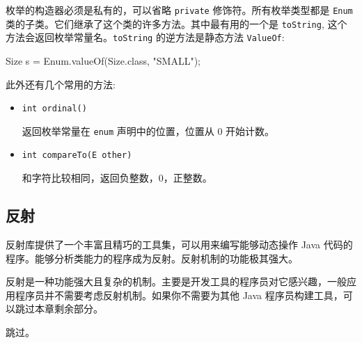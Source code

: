 枚举的构造器必须是私有的，可以省略 \texttt{private} 修饰符。所有枚举类型都是 \texttt{Enum} 类的子类。它们继承了这个类的许多方法。其中最有用的一个是 \texttt{toString}, 这个方法会返回枚举常量名。\texttt{toString} 的逆方法是静态方法 \texttt{ValueOf}:
\begin{Java}
Size s = Enum.valueOf(Size.class, "SMALL");
\end{Java}

此外还有几个常用的方法:
\begin{itemize}
    \item \texttt{int ordinal()}
    
    返回枚举常量在 \texttt{enum} 声明中的位置，位置从 0 开始计数。
    \item \texttt{int compareTo(E other)}
    
    和字符比较相同，返回负整数，0，正整数。
\end{itemize}

\subsection{反射}

反射库提供了一个丰富且精巧的工具集，可以用来编写能够动态操作 Java 代码的程序。能够分析类能力的程序成为反射。反射机制的功能极其强大。

反射是一种功能强大且复杂的机制。主要是开发工具的程序员对它感兴趣，一般应用程序员并不需要考虑反射机制。如果你不需要为其他 Java 程序员构建工具，可以跳过本章剩余部分。

跳过。

\newpage
